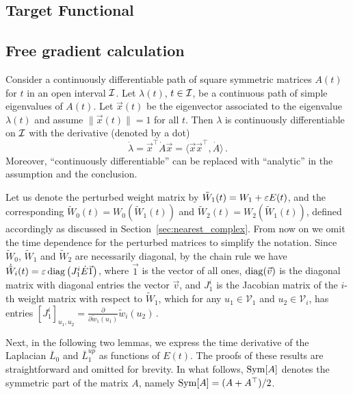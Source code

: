 \subsection{ Target Functional }


\subsection{ Free gradient calculation }

\begin{theorem}\label{lem:eigderiv} 
  Consider a continuously differentiable path of square symmetric matrices $A(t)$ for $t$ in an open interval $\mathcal{I}$. Let $\lambda(t)$, $t\in \mathcal{I}$, be a continuous path of simple eigenvalues of $A(t)$. Let $\vec x(t)$ be the eigenvector associated to the eigenvalue $\lambda(t)$ and assume
  $\| \vec x(t) \| = 1$ for all $t$. 
  Then $\lambda$ is continuously differentiable on $\mathcal{I}$ with the derivative (denoted by a dot) 
  \begin{equation}
  \dot{\lambda} = \vec x^\top \dot{A} \vec x = \langle \vec  x \vec x^\top, \dot A \rangle\,.
  \end{equation}
  Moreover, ``continuously differentiable'' can be replaced with ``analytic'' in the assumption and the conclusion.
  \end{theorem}
  
  Let us denote the perturbed weight matrix by $\tilde W_1 (t) = W_1 + \varepsilon E(t)$, and the corresponding $\tilde W_0 (t) = W_0(\tilde W_1(t))$ and $ \tilde W_2 (t) = W_2 (\tilde W_1(t) )$, defined accordingly as discussed in Section~\ref{sec:nearest_complex}. From now on
  we omit the time dependence for the perturbed matrices to simplify the notation.  
  Since $\tilde W_0$, $\tilde W_1$ and $\tilde W_2$ are necessarily diagonal, by the chain rule we have $\dot{\tilde{W}}_i (t) = \varepsilon \operatorname{diag} \left( J_1^i  \dot E \vec 1  \right)$, where $\vec 1$ is the vector of all ones, $\operatorname{diag}(\vec v)$ is the diagonal matrix with diagonal entries the vector $\vec v$, and  $J_1^i$ is the Jacobian matrix of the $i$-th weight matrix with respect to $\tilde W_1$, which for any $u_1\in \mathcal V_1$ and $u_2 \in \mathcal V_i$, has entries 
  \(
      [J_1^i]_{u_1,u_2}=\frac{\partial }{\partial \tilde{w}_1{(u_1)}}\tilde{w}_i{(u_2)}\, .
  \)
  
  Next, in the following two lemmas, we express the time derivative of the Laplacian $\bar L_0$ and $\bar L_1^{up}$ as functions of $E(t)$. The proofs of these results are  straightforward and omitted for brevity. In what follows, $\operatorname{Sym}[A]$ denotes the symmetric part of the matrix $A$, namely $\operatorname{Sym}[A] = (A+A^\top)/2$.
  
